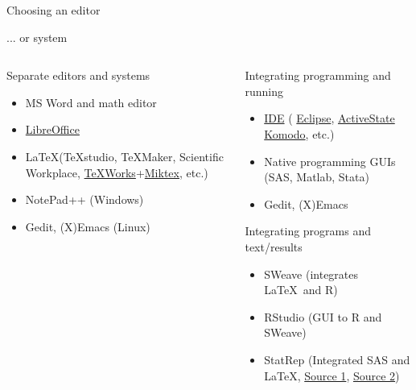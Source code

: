 \documentclass[10pt,letterpaper]{beamer}
\begin{document}
\begin{frame}{Choosing an editor}
\begin{block}{... or system}
\begin{columns}[t]
\begin{column}{.48\textwidth}
\color{red}
Separate editors and systems 
\begin{itemize}
\item MS Word and math editor
\item \href{http://www.libreoffice.org}{LibreOffice}
\item \LaTeX (TeXstudio, TeXMaker, Scientific Workplace, \href{http://www.tug.org/texworks/}{TeXWorks}+\href{http://miktex.org/}{Miktex}, etc.)
\item NotePad++ (Windows)
\item Gedit, (X)Emacs (Linux)
\end{itemize}
\end{column}
\hfill
\begin{column}{.48\textwidth}
\color{blue}
Integrating programming and running
\begin{itemize}
\item \href{http://en.wikipedia.org/wiki/Integrated_development_environment}{IDE} ( \href{http://en.wikipedia.org/wiki/Eclipse_(software)}{Eclipse}, \href{http://en.wikipedia.org/wiki/ActiveState_Komodo}{ActiveState Komodo}, etc.)
\item Native programming GUIs (SAS, Matlab, Stata)
\item Gedit, (X)Emacs 
\end{itemize}
Integrating programs and text/results
\begin{itemize}
\item SWeave (integrates \LaTeX \ and R)
\item RStudio (GUI to R and SWeave)
\item StatRep (Integrated SAS and \LaTeX, \href{http://support.sas.com/resources/papers/proceedings12/324-2012.pdf}{Source 1}, \href{http://support.sas.com/StatRepPackage}{Source 2})
\end{itemize}
\end{column}
\end{columns}


\end{block}

\end{frame}
\end{document}
